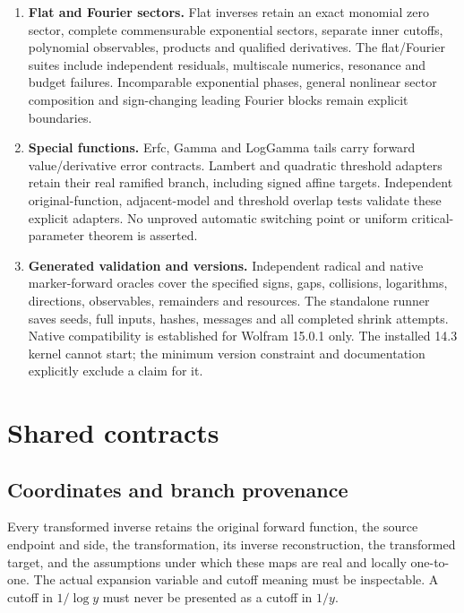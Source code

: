 \documentclass[11pt,a4paper]{article}
\begin{document}
\begin{enumerate}[leftmargin=1.8em]
precisions and bounded polynomial-power caches preserve exact results and
resource budgets. The nine-case benchmark includes every named parameter
family and deep one-gap Catalan coefficients through cutoff 64. It records
regressions as well as improvements; no portable time threshold defines
correctness.
\item \textbf{Flat and Fourier sectors.} Flat inverses retain an exact
monomial zero sector, complete commensurable exponential sectors, separate
inner cutoffs, polynomial observables, products and qualified derivatives.
The flat/Fourier suites include independent residuals, multiscale
numerics, resonance and budget failures. Incomparable exponential phases,
general nonlinear sector composition and sign-changing leading Fourier
blocks remain explicit boundaries.
\item \textbf{Special functions.} Erfc, Gamma and LogGamma tails carry
forward value/derivative error contracts. Lambert and quadratic threshold
adapters retain their real ramified branch, including signed affine
targets. Independent original-function, adjacent-model and threshold
overlap tests validate these explicit adapters. No unproved automatic
switching point or uniform critical-parameter theorem is asserted.
\item \textbf{Generated validation and versions.} Independent radical
and native marker-forward oracles cover the specified signs, gaps,
collisions, logarithms, directions, observables, remainders and resources.
The standalone runner saves seeds, full inputs, hashes, messages and all
completed shrink attempts. Native compatibility is established for
Wolfram 15.0.1 only. The installed 14.3 kernel cannot start; the minimum
version constraint and documentation explicitly exclude a claim for it.
\end{enumerate}

\section{Shared contracts}

\subsection{Coordinates and branch provenance}

Every transformed inverse retains the original forward function, the source endpoint and side, the transformation, its inverse reconstruction, the transformed target, and the assumptions under which these maps are real and locally one-to-one. The actual expansion variable and cutoff meaning must be inspectable. A cutoff in $1/\log y$ must never be presented as a cutoff in $1/y$.
\end{document}

